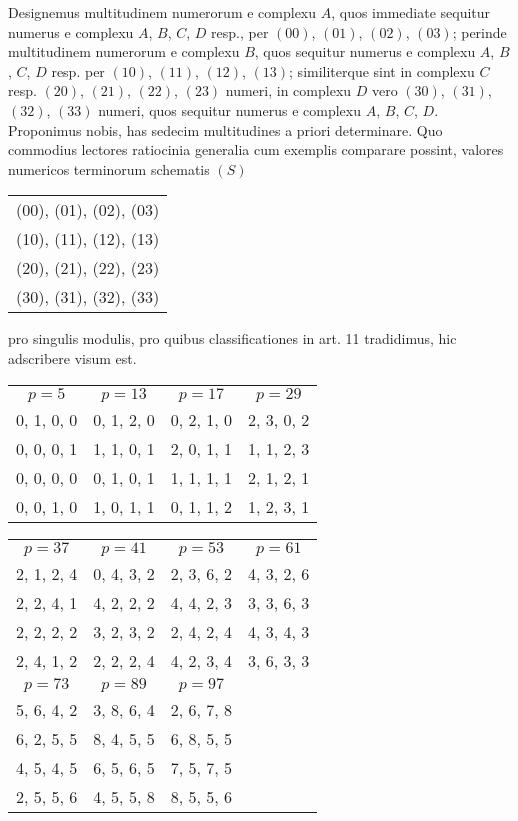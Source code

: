 \documentclass[twoside,12pt, showframe]{memoir}
\begin{document}
Designemus multitudinem numerorum e complexu \(A\), quos immediate sequitur numerus e complexu \(A\), \(B\), \(C\), \(D\) resp., per \((00)\), \((01)\), \((02)\), \((03)\); perinde multitudinem numerorum e complexu \(B\), quos sequitur numerus e complexu \(A\), \(B\), \(C\), \(D\) resp. per \((10)\), \((11)\), \((12)\), \((13)\); similiterque sint in complexu \(C\) resp. \((20)\), \((21)\), \((22)\), \((23)\) numeri, in complexu \(D\) vero \((30)\), \((31)\), \((32)\), \((33)\) numeri, quos sequitur numerus e complexu \(A\), \(B\), \(C\), \(D\). Proponimus nobis, has sedecim multitudines a priori determinare. Quo commodius lectores ratiocinia generalia cum exemplis comparare possint, valores numericos terminorum schematis \(({S})\)
\begin{center}\begin{tabular}{c}
(00), (01), (02), (03) \\
(10), (11), (12), (13) \\
(20), (21), (22), (23) \\
(30), (31), (32), (33)
\end{tabular}\end{center}
pro singulis modulis, pro quibus classificationes in art. 11 tradidimus, hic adscribere visum est.
\begin{center}\begin{tabular}{c|c|c|c}
\(p=5\) & \(p=13\) & \(p=17\) & \(p=29\) \\
0, 1, 0, 0 & 0, 1, 2, 0 & 0, 2, 1, 0 & 2, 3, 0, 2 \\
0, 0, 0, 1 & 1, 1, 0, 1 & 2, 0, 1, 1 & 1, 1, 2, 3 \\
0, 0, 0, 0 & 0, 1, 0, 1 & 1, 1, 1, 1 & 2, 1, 2, 1 \\
0, 0, 1, 0 & 1, 0, 1, 1 & 0, 1, 1, 2 & 1, 2, 3, 1
\end{tabular}\clearpage\noindent%
\begin{tabular}{c|c|c|c}
\(p=37\) & \(p=41\) & \(p=53\) & \(p=61\) \\
2, 1, 2, 4 & 0, 4, 3, 2 & 2, 3, 6, 2 & 4, 3, 2, 6 \\
2, 2, 4, 1 & 4, 2, 2, 2 & 4, 4, 2, 3 & 3, 3, 6, 3 \\
2, 2, 2, 2 & 3, 2, 3, 2 & 2, 4, 2, 4 & 4, 3, 4, 3 \\
2, 4, 1, 2 & 2, 2, 2, 4 & 4, 2, 3, 4 & 3, 6, 3, 3 \\
\hline
\(p=73\) & \(p=89\) & \(p=97\)   \\
5, 6, 4, 2 & 3, 8, 6, 4 & 2, 6, 7, 8   \\
6, 2, 5, 5 & 8, 4, 5, 5 & 6, 8, 5, 5   \\
4, 5, 4, 5 & 6, 5, 6, 5 & 7, 5, 7, 5   \\
2, 5, 5, 6 & 4, 5, 5, 8 & 8, 5, 5, 6   \\
\end{tabular}
\end{center}
 
\end{document}
